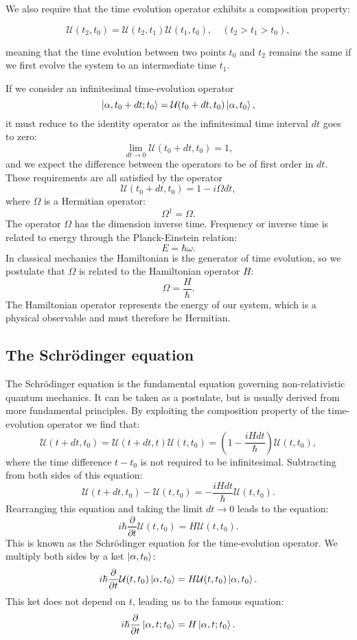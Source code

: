 We also require that the time evolution operator
exhibits a composition property:

$$ \mathcal{U}(t_2, t_0) = \mathcal{U}(t_2, t_1)
    \mathcal{U}(t_1, t_0), \quad (t_2 > t_1 > t_0) , $$

meaning that the time evolution between two points
$t_0$ and $t_2$ remains the same if we first evolve the system
to an intermediate time $t_1$.
\par
If we consider an infinitesimal time-evolution operator
$$ \ket{\alpha, t_0 + dt; t_0} = \mathcal{U}(t_0 + dt, t_0)
\ket{\alpha, t_0} ,$$
it must reduce to the identity operator as the infinitesimal
time interval $dt$ goes to zero:
$$ \lim_{dt \rightarrow 0} \mathcal{U}(t_0 + dt, t_0) = 1, $$
and we expect the difference between the operators
to be of first order in $dt$.
\newline
These requirements are all satisfied by the operator
$$ \mathcal{U}(t_0 + dt, t_0) = 1 - i\Omega dt ,$$
where $\Omega$ is a Hermitian operator:
$$ \Omega^{\dagger} = \Omega .$$
The operator $\Omega$ has the dimension inverse time.
Frequency or inverse time is related to energy
through the Planck-Einstein relation:
$$ E = \hbar \omega .$$
In classical mechanics the Hamiltonian is the generator of time evolution,
so we postulate that $\Omega$ is related to the Hamiltonian operator
$H$:
$$ \Omega = \frac{H}{\hbar} .$$
The Hamiltonian operator represents the energy of our system,
which is a physical observable and must therefore be Hermitian.

\subsection{The Schr\"{o}dinger equation}
The Schr\"{o}dinger equation is the fundamental equation
governing non-relativistic quantum mechanics. It can be taken
as a postulate, but is usually derived from more fundamental
principles.
By exploiting the composition property of the time-evolution
operator we find that:
$$ \mathcal{U}(t + dt, t_0) = \mathcal{U}(t + dt, t)
    \mathcal{U}(t, t_0) = (1 - \frac{i H dt}{\hbar})
    \mathcal{U}(t, t_0) ,$$
where the time difference $t - t_0$ is not required to be infinitesimal.
Subtracting from both sides of this equation:
$$ \mathcal{U}(t + dt, t_0) - \mathcal{U}(t, t_0) =
    -\frac{iHdt}{\hbar} \mathcal{U}(t, t_0) .$$
Rearranging this equation and taking the limit $dt \rightarrow 0$
leads to the equation:
$$ i \hbar \frac{\partial}{\partial t} \mathcal{U}(t, t_0)
    = H \mathcal{U}(t, t_0) .$$
This is known as the Schr\"{o}dinger equation for the time-evolution operator.
We multiply both sides by a ket $\ket{\alpha, t_0}$:
$$ i \hbar \frac{\partial}{\partial t} \mathcal{U}(t, t_0)
    \ket{\alpha, t_0} = H \mathcal{U}(t, t_0) \ket{\alpha, t_0} .$$
This ket does not depend on $t$, leading us to the famous equation:
$$ i \hbar \frac{\partial}{\partial t}
    \ket{\alpha, t; t_0} = H \ket{\alpha, t; t_0} .$$


